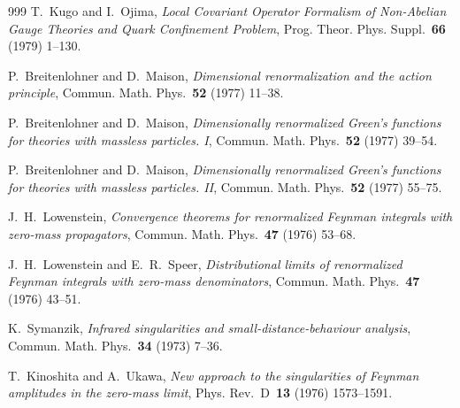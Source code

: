 \begin{thebibliography}{999}
T.~Kugo and I.~Ojima, \emph{Local Covariant Operator Formalism of Non-Abelian Gauge Theories and Quark Confinement Problem}, Prog. Theor. Phys. Suppl.~\textbf{66} (1979) \mbox{1--130}.

P.~Breitenlohner and D.~Maison, \emph{Dimensional renormalization and the action principle}, Commun. Math. Phys.~\textbf{52} (1977) \mbox{11--38}.

P.~Breitenlohner and D.~Maison, \emph{Dimensionally renormalized Green's functions for theories with massless particles. I}, Commun. Math. Phys.~\textbf{52} (1977) \mbox{39--54}.

P.~Breitenlohner and D.~Maison, \emph{Dimensionally renormalized Green's functions for theories with massless particles. II}, Commun. Math. Phys.~\textbf{52} (1977) \mbox{55--75}.

J.~H.~Lowenstein, \emph{Convergence theorems for renormalized Feynman integrals with zero-mass propagators}, Commun. Math. Phys.~\textbf{47} (1976) \mbox{53--68}.

J.~H.~Lowenstein and E.~R.~Speer, \emph{Distributional limits of renormalized Feynman integrals with zero-mass denominators}, Commun. Math. Phys.~\textbf{47} (1976) \mbox{43--51}.

K.~Symanzik, \emph{Infrared singularities and small-distance-behaviour analysis}, Commun. Math. Phys.~\textbf{34} (1973) \mbox{7--36}.

T.~Kinoshita and A.~Ukawa, \emph{New approach to the singularities of Feynman amplitudes in the zero-mass limit}, Phys. Rev.~D~\textbf{13} (1976) \mbox{1573--1591}.

\end{thebibliography}
